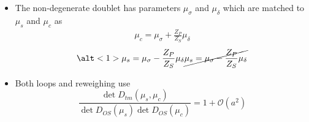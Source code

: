 \documentclass[xcolor={dvipsnames,table}]{beamer}
\begin{document}
\begin{frame}
  \begin{itemize}
    \item The non-degenerate doublet has  parameters $\mu_\sigma$ and $\mu_\delta$ which are matched
          to $\mu_s$ and $\mu_c$ as
          \begin{gather*}
            \mu_c = \mu_\sigma + \frac{Z_P}{Z_S} \mu_\delta
          \end{gather*}
          \begin{gather*}
            \alt<1>{\mu_s = \mu_\sigma - \frac{Z_P}{Z_S} \mu_\delta }
            {\cancel{
                \mu_s = \mu_\sigma - \frac{Z_P}{Z_S} \mu_\delta }
            }
          \end{gather*}
    \item<2-> Both loops and reweighing use
          $$
            \frac{\det{D_{tm}(\mu_s,\mu_c)}}{\det{D_{OS}(\mu_s)\det{D_{OS}(\mu_c)}}} = 1 + \mathcal{O}(a^2)
          $$
  \end{itemize}
\end{frame}
\end{document}
